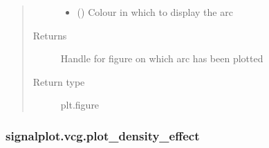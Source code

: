 \documentclass[letterpaper,10pt,english]{sphinxmanual}
\begin{document}
\begin{fulllineitems}
\begin{quote}
\begin{description}
\begin{itemize}
\item {} 
\sphinxAtStartPar
{} (\sphinxstyleliteralemphasis{\sphinxupquote{, }}) \textendash{} Colour in which to display the arc

\end{itemize}

\item[{Returns}] \leavevmode
\sphinxAtStartPar
{} \textendash{} Handle for figure on which arc has been plotted

\item[{Return type}] \leavevmode
\sphinxAtStartPar
plt.figure

\end{description}\end{quote}

\end{fulllineitems}



\subsubsection{signalplot.vcg.plot\_density\_effect}
\label{\detokenize{_autosummary/signalplot.vcg.plot_density_effect:signalplot-vcg-plot-density-effect}}\label{\detokenize{_autosummary/signalplot.vcg.plot_density_effect::doc}}
\end{document}
